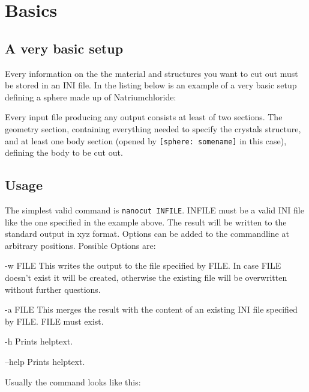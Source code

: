 \section{Basics}
\subsection{A very basic setup}

Every information on the the material and structures you want to cut out must be stored in an INI file. In the listing below is an example of a very basic setup defining a sphere made up of Natriumchloride:

Every input file producing any output consists at least of two sections. The geometry section, containing everything needed to specify the crystals structure, and at least one body section (opened by \lstinline{[sphere: somename]} in this case), defining the body to be cut out.

\subsection{Usage}

The simplest valid command is \lstinline{nanocut INFILE}. INFILE must be a valid INI file like the one specified in the example above. The result will be written to the standard output in xyz format. Options can be added to the commandline at arbitrary positions. Possible Options are:
\begin{description}
 \item{-w FILE} This writes the output to the file specified by FILE. In case FILE doesn't exist it will be created, otherwise the existing file will be overwritten without further questions.
 \item{-a FILE} This merges the result with the content of an existing INI file specified by FILE. FILE must exist.
 \item{-h} Prints helptext.
 \item{--help} Prints helptext.
\end{description}
Usually the command looks like this: 